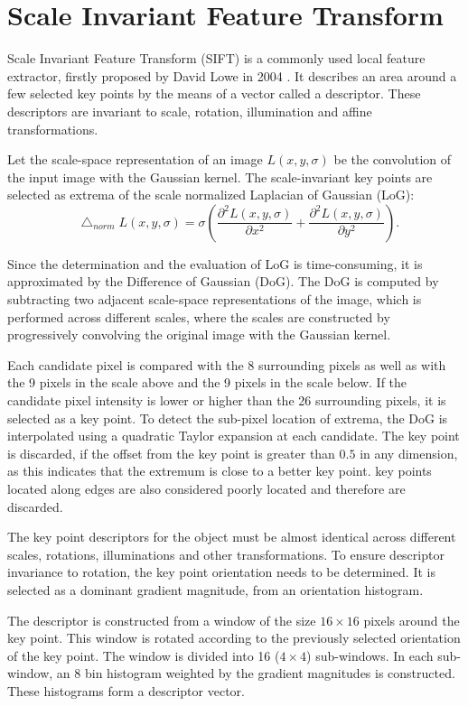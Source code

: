 \documentclass{aip-cp}
\newcommand*\Laplace{\mathop{}\!\mathbin\bigtriangleup}
\begin{document}
\section{Scale Invariant Feature Transform}
Scale Invariant Feature Transform (SIFT) is a commonly used local feature extractor, firstly proposed by David Lowe in 2004 \cite{Lowe2004}. It describes an area around a few selected key points by the means of a vector called a descriptor. These descriptors are invariant to scale, rotation, illumination and affine transformations.

Let the scale-space representation of an image $L(x,y,\sigma)$ be the convolution of the input image with the Gaussian kernel. The scale-invariant key points are selected as extrema of the scale normalized Laplacian of Gaussian (LoG):
\begin{equation}
    \Laplace_{norm} L(x, y, \sigma) = \sigma \left(\frac{\partial^2 L(x,y,\sigma)}{\partial x^2} + \frac{\partial^2 L(x,y,\sigma)}{\partial y^2}\right).
\end{equation}

Since the determination and the evaluation of LoG is time-consuming, it is approximated by the Difference of Gaussian (DoG). The DoG is computed by subtracting two adjacent scale-space representations of the image, which is performed across different scales, where the scales are constructed by progressively convolving the original image with the Gaussian kernel.

Each candidate pixel is compared with the 8 surrounding pixels as well as with the 9 pixels in the scale above and the 9 pixels in the scale below. If the candidate pixel intensity is lower or higher than the 26 surrounding pixels, it is selected as a key point. To detect the sub-pixel location of extrema, the DoG is interpolated using a quadratic Taylor expansion at each candidate. The key point is discarded, if the offset from the key point is greater than $0.5$ in any dimension, as this indicates that the extremum is close to a better key point. key points located along edges are also considered poorly located and therefore are discarded.

The key point descriptors for the object must be almost identical across different scales, rotations, illuminations and other transformations. To ensure descriptor invariance to rotation, the key point orientation needs to be determined. It is selected as a dominant gradient magnitude, from an orientation histogram.

The descriptor is constructed from a window of the size $16 \times 16$ pixels around the key point. This window is rotated according to the previously selected orientation of the key point. The window is divided into 16 ($4 \times 4$) sub-windows. In each sub-window, an $8$ bin histogram weighted by the gradient magnitudes is constructed. These histograms form a descriptor vector.
\end{document}
